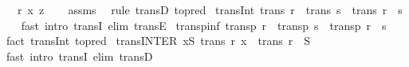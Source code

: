 \begin{isabellebody}
\ \ \ {\isachardoublequoteopen}r\ x\ z{\isachardoublequoteclose}\isanewline
%
\isadelimproof
\ \ %
\endisadelimproof
%
\isatagproof
{}\isamarkupfalse%
\ assms\ \isamarkupfalse%
\ {\isacharparenleft}{\kern0pt}rule\ transD\ {\isacharbrackleft}{\kern0pt}to{\isacharunderscore}{\kern0pt}pred{\isacharbrackright}{\kern0pt}{\isacharparenright}{\kern0pt}%
\endisatagproof
{\isafoldproof}%
%
\isadelimproof
\isanewline
%
\endisadelimproof
\isanewline
{}\isamarkupfalse%
\ trans{\isacharunderscore}{\kern0pt}Int{\isacharcolon}{\kern0pt}\ {\isachardoublequoteopen}trans\ r\ {\isasymLongrightarrow}\ trans\ s\ {\isasymLongrightarrow}\ trans\ {\isacharparenleft}{\kern0pt}r\ {\isasyminter}\ s{\isacharparenright}{\kern0pt}{\isachardoublequoteclose}\isanewline
%
\isadelimproof
\ \ %
\endisadelimproof
%
\isatagproof
{}\isamarkupfalse%
\ {\isacharparenleft}{\kern0pt}fast\ intro{\isacharcolon}{\kern0pt}\ transI\ elim{\isacharcolon}{\kern0pt}\ transE{\isacharparenright}{\kern0pt}%
\endisatagproof
{\isafoldproof}%
%
\isadelimproof
\isanewline
%
\endisadelimproof
\isanewline
{}\isamarkupfalse%
\ transp{\isacharunderscore}{\kern0pt}inf{\isacharcolon}{\kern0pt}\ {\isachardoublequoteopen}transp\ r\ {\isasymLongrightarrow}\ transp\ s\ {\isasymLongrightarrow}\ transp\ {\isacharparenleft}{\kern0pt}r\ {\isasymsqinter}\ s{\isacharparenright}{\kern0pt}{\isachardoublequoteclose}\isanewline
%
\isadelimproof
\ \ %
\endisadelimproof
%
\isatagproof
{}\isamarkupfalse%
\ {\isacharparenleft}{\kern0pt}fact\ trans{\isacharunderscore}{\kern0pt}Int\ {\isacharbrackleft}{\kern0pt}to{\isacharunderscore}{\kern0pt}pred{\isacharbrackright}{\kern0pt}{\isacharparenright}{\kern0pt}%
\endisatagproof
{\isafoldproof}%
%
\isadelimproof
\isanewline
%
\endisadelimproof
\isanewline
{}\isamarkupfalse%
\ trans{\isacharunderscore}{\kern0pt}INTER{\isacharcolon}{\kern0pt}\ {\isachardoublequoteopen}{\isasymforall}x{\isasymin}S{\isachardot}{\kern0pt}\ trans\ {\isacharparenleft}{\kern0pt}r\ x{\isacharparenright}{\kern0pt}\ {\isasymLongrightarrow}\ trans\ {\isacharparenleft}{\kern0pt}{\isasymInter}{\isacharparenleft}{\kern0pt}r\ {\isacharbackquote}{\kern0pt}\ S{\isacharparenright}{\kern0pt}{\isacharparenright}{\kern0pt}{\isachardoublequoteclose}\isanewline
%
\isadelimproof
\ \ %
\endisadelimproof
%
\isatagproof
{}\isamarkupfalse%
\ {\isacharparenleft}{\kern0pt}fast\ intro{\isacharcolon}{\kern0pt}\ transI\ elim{\isacharcolon}{\kern0pt}\ transD{\isacharparenright}{\kern0pt}%
\endisatagproof
{\isafoldproof}%

\end{isabellebody}
